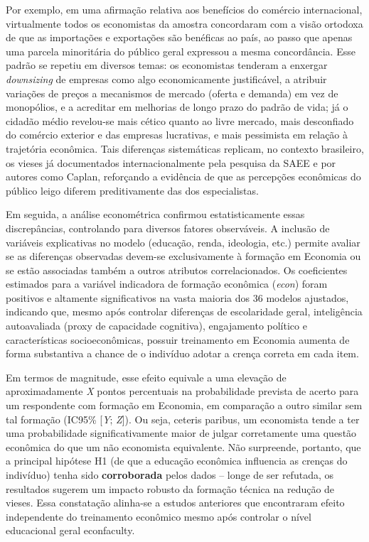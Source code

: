 Por exemplo, em uma afirmação relativa aos benefícios do comércio internacional, virtualmente todos os economistas da amostra concordaram com a visão ortodoxa de que as importações e exportações são benéficas ao país, ao passo que apenas uma parcela minoritária do público geral expressou a mesma concordância. Esse padrão se repetiu em diversos temas: os economistas tenderam a enxergar \emph{downsizing} de empresas como algo economicamente justificável, a atribuir variações de preços a mecanismos de mercado (oferta e demanda) em vez de monopólios, e a acreditar em melhorias de longo prazo do padrão de vida; já o cidadão médio revelou-se mais cético quanto ao livre mercado, mais desconfiado do comércio exterior e das empresas lucrativas, e mais pessimista em relação à trajetória econômica. Tais diferenças sistemáticas replicam, no contexto brasileiro, os vieses já documentados internacionalmente pela pesquisa da SAEE e por autores como Caplan, reforçando a evidência de que as percepções econômicas do público leigo diferem preditivamente das dos especialistas. 

Em seguida, a análise econométrica confirmou estatisticamente essas discrepâncias, controlando para diversos fatores observáveis. A inclusão de variáveis explicativas no modelo (educação, renda, ideologia, etc.) permite avaliar se as diferenças observadas devem-se exclusivamente à formação em Economia ou se estão associadas também a outros atributos correlacionados. Os coeficientes estimados para a variável indicadora de formação econômica (\textit{econ}) foram positivos e altamente significativos na vasta maioria dos 36 modelos ajustados, indicando que, mesmo após controlar diferenças de escolaridade geral, inteligência autoavaliada (proxy de capacidade cognitiva), engajamento político e características socioeconômicas, possuir treinamento em Economia aumenta de forma substantiva a chance de o indivíduo adotar a crença correta em cada item. 

Em termos de magnitude, esse efeito equivale a uma elevação de aproximadamente \textit{X} pontos percentuais na probabilidade prevista de acerto para um respondente com formação em Economia, em comparação a outro similar sem tal formação (IC95\% [\textit{Y}; \textit{Z}]). Ou seja, ceteris paribus, um economista tende a ter uma probabilidade significativamente maior de julgar corretamente uma questão econômica do que um não economista equivalente. Não surpreende, portanto, que a principal hipótese H1 (de que a educação econômica influencia as crenças do indivíduo) tenha sido \textbf{corroborada} pelos dados -- longe de ser refutada, os resultados sugerem um impacto robusto da formação técnica na redução de vieses. Essa constatação alinha-se a estudos anteriores que encontraram efeito independente do treinamento econômico mesmo após controlar o nível educacional geral
econfaculty.

